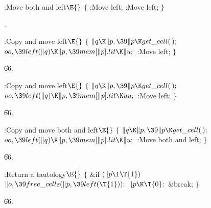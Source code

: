 \B{}:Move both  and  left\X${}\E{}$\6
${}\{{}$\1\6
:Move  left\X;\6
:Move  left\X;\6
\4${}\}{}$\2\par
{}.\fi

\B{}:Copy  and move  left\X${}\E{}$\6
${}\{{}$\1\6
${}\|q\K\|p,\39\|p\K\\{get\_cell}(\,);{}$\6
${}\\{oo},\39\\{left}(\|q)\K\|p,\39\\{mem}[\|p].\\{lit}\K\|u;{}$\6
:Move  left\X;\6
\4${}\}{}$\2\par
\U66.\fi

\B{}:Copy  and move  left\X${}\E{}$%
\6
${}\{{}$\1\6
${}\|q\K\|p,\39\|p\K\\{get\_cell}(\,);{}$\6
${}\\{oo},\39\\{left}(\|q)\K\|p,\39\\{mem}[\|p].\\{lit}\K\\{uu};{}$\6
:Move  left\X;\6
\4${}\}{}$\2\par
\U66.\fi

\B{}:Copy  and move both  and 
left\X${}\E{}$\6
${}\{{}$\1\6
${}\|q\K\|p,\39\|p\K\\{get\_cell}(\,);{}$\6
${}\\{oo},\39\\{left}(\|q)\K\|p,\39\\{mem}[\|p].\\{lit}\K\|u;{}$\6
:Move both  and  left\X;\6
\4${}\}{}$\2\par
\U66.\fi

\B{}:Return a tautology\X${}\E{}$\6
${}\{{}$\1\6
\&{if} ${}(\|p\I\T{1}){}$\1\5
${}\|o,\39\\{free\_cells}(\|p,\39\\{left}(\T{1}));{}$\2\6
${}\|p\K\T{0};{}$\6
\&{break};\6
\4${}\}{}$\2\par
\U66.\fi

